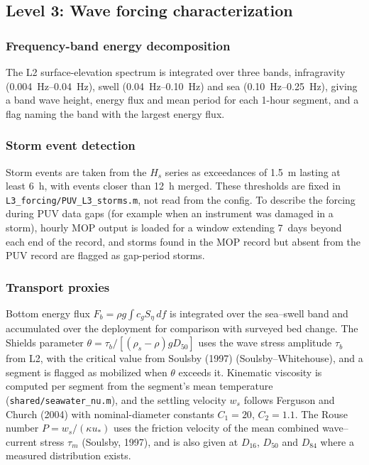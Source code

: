 \subsection{Level 3: Wave forcing characterization}

\subsubsection{Frequency-band energy decomposition}

The L2 surface-elevation spectrum is integrated over three bands, infragravity
(\SIrange{0.004}{0.04}{\hertz}), swell (\SIrange{0.04}{0.10}{\hertz}) and sea
(\SIrange{0.10}{0.25}{\hertz}), giving a band wave height, energy flux and mean
period for each 1-hour segment, and a flag naming the band with the largest
energy flux.

\subsubsection{Storm event detection}

Storm events are taken from the $H_s$ series as exceedances of
\SI{1.5}{\meter} lasting at least \SI{6}{\hour}, with events closer than
\SI{12}{\hour} merged. These thresholds are fixed in
\texttt{L3\_forcing/PUV\_L3\_storms.m}, not read from the config. To describe the
forcing during PUV data gaps (for example when an instrument was damaged in a
storm), hourly MOP output is loaded for a window extending \SI{7}{days} beyond
each end of the record, and storms found in the MOP record but absent from the
PUV record are flagged as gap-period storms.

\subsubsection{Transport proxies}

Bottom energy flux $F_b = \rho g \int c_g S_\eta\,df$ is integrated over the
sea--swell band and accumulated over the deployment for comparison with surveyed
bed change. The Shields parameter
$\theta = \tau_b / [(\rho_s - \rho) g D_{50}]$ uses the wave stress amplitude
$\tau_b$ from L2, with the critical value from Soulsby (1997)
(Soulsby--Whitehouse), and a segment is flagged as mobilized when
$\theta$ exceeds it. Kinematic viscosity is computed per segment from the
segment's mean temperature (\texttt{shared/seawater\_nu.m}), and the settling
velocity $w_s$ follows Ferguson and Church (2004) with nominal-diameter constants
$C_1 = 20$, $C_2 = 1.1$. The Rouse number $P = w_s / (\kappa u_*)$ uses the
friction velocity of the mean combined wave--current stress $\tau_m$
(Soulsby, 1997), and is also given at $D_{16}$, $D_{50}$ and $D_{84}$ where a
measured distribution exists.

